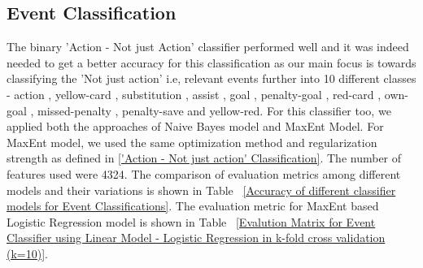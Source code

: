 \documentclass[11pt,letterpaper]{article}
\begin{document}
\subsection{Event Classification}
The binary 'Action - Not just Action' classifier performed well and it was indeed needed to get a better accuracy for this classification as our main focus is towards classifying the 'Not just action' i.e, relevant events further into 10 different classes - action , yellow-card , substitution , assist , goal , penalty-goal , red-card , own-goal , missed-penalty , penalty-save  and  yellow-red. For this classifier too, we applied both the approaches of Naive Bayes model and MaxEnt Model. For MaxEnt model, we used the same optimization method and regularization strength as defined in \ref{'Action - Not just action' Classification}. The number of features used were 4324.  The comparison of evaluation metrics among different models and their variations is shown in Table ~\ref{Accuracy of different classifier models for Event Classifications}. The evaluation metric for MaxEnt based Logistic Regression model is shown in Table ~\ref{Evalution Matrix for Event Classifier using Linear Model - Logistic Regression in k-fold cross validation (k=10)}.\\
\begin{table}
\caption{Accuracy of different classifier models for Event Classifications} \label{Accuracy of different classifier models for Event Classifications}
\begin{center}
\end{center}
\end{table}
\end{document}
